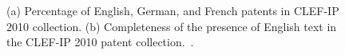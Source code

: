 \begin{figure}[t!]
\begin{centering}
\par\end{centering}

\begin{centering}
\par\end{centering}
\vspace{1mm}
\protect\caption{(a) Percentage of English, German, and French patents in CLEF-IP 2010 collection.
                 (b) Completeness of the presence of English text in the CLEF-IP 2010 patent collection.~\citep{magdy2012toward}.}
\label{fig:lang}
\end{figure}
